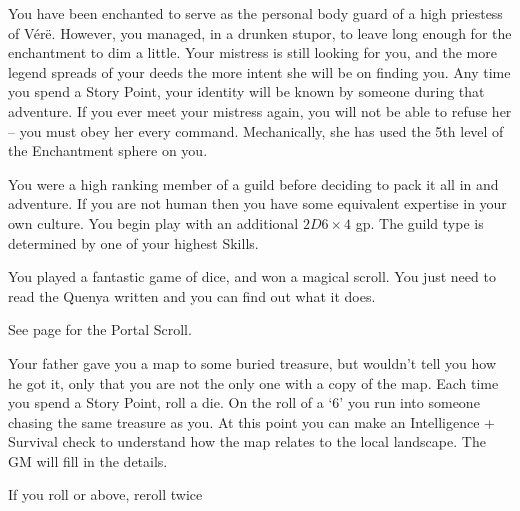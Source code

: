 \begin{multicols}{2}
\begin{list}{\addtocounter{list}{1}\textbf{:}}{\raggedleft}
\item{You have been enchanted to serve as the personal body guard of a high priestess of V\'{e}r\"{e}.  However, you managed, in a drunken stupor, to leave long enough for the enchantment to dim a little.  Your mistress is still looking for you, and the more legend spreads of your deeds the more intent she will be on finding you.  Any time you spend a Story Point, your identity will be known by someone during that adventure.  If you ever meet your mistress again, you will not be able to refuse her -- you must obey her every command.  Mechanically, she has used the 5th level of the Enchantment sphere on you.}

\item{You were a high ranking member of a guild before deciding to pack it all in and adventure.  If you are not human then you have some equivalent expertise in your own culture.  You begin play with an additional $2D6\times4$ gp.  The guild type is determined by one of your highest Skills.}

\item{You played a fantastic game of dice, and won a magical scroll.
You just need to read the Quenya written and you can find out what it does.

See page \pageref{portalscroll} for the Portal Scroll.

}

\item{Your father gave you a map to some buried treasure, but wouldn't tell you how he got it, only that you are not the only one with a copy of the map.
Each time you spend a Story Point, roll a die.
On the roll of a `6' you run into someone chasing the same treasure as you.
At this point you can make an Intelligence + Survival check to understand how the map relates to the local landscape.
The GM will fill in the details.}

\item{If you roll  or above, reroll twice}

\end{list}

\end{multicols}

